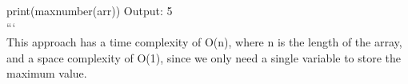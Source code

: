\documentclass[preview]{standalone}
\begin{document}
print(maxnumber(arr))   Output: 5\\```\\This approach has a time complexity of O(n), where n is the length of the array, and a space complexity of O(1), since we only need a single variable to store the maximum value.\\
\end{document}
